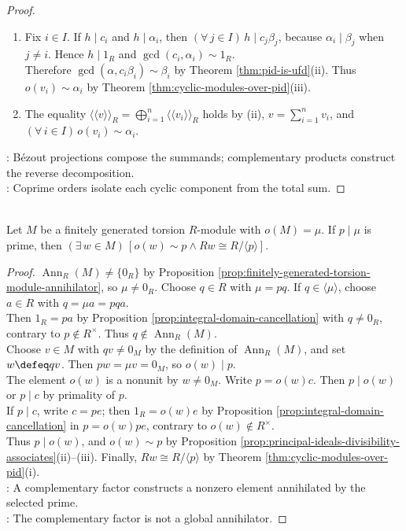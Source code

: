\begin{theorem}
\begin{proof}
\begin{enumerate}[label=(\roman*)]
\begin{enumerate}[label=(\alph*)]
\item Fix $i\in I$. If $h\mid c_i$ and $h\mid\alpha_i$, then $(\forall\,j\in I)\,h\mid c_j\beta_j$, because $\alpha_i\mid\beta_j$ when $j\neq i$. Hence $h\mid1_R$ and $\gcd(c_i,\alpha_i)\sim1_R$.\\
Therefore $\gcd(\alpha,c_i\beta_i)\sim\beta_i$ by Theorem \ref{thm:pid-is-ufd}(ii). Thus $o(v_i)\sim\alpha_i$ by Theorem \ref{thm:cyclic-modules-over-pid}(iii).
\item The equality $\langle\!\langle v\rangle\!\rangle_R=\bigoplus\limits_{i=1}^{n}\langle\!\langle v_i\rangle\!\rangle_R$ holds by (ii), $v=\sum\limits_{i=1}^{n}v_i$, and $(\forall\,i\in I)\,o(v_i)\sim\alpha_i$.
\end{enumerate}
\end{enumerate}
\noindent
{}: Bézout projections compose the summands; complementary products construct the reverse decomposition.\\
: Coprime orders isolate each cyclic component from the total sum.
\end{proof}
\end{theorem}

\begin{proposition} \label{prop:prime-divisor-prime-order-submodule} \\
Let $M$ be a finitely generated torsion $R$-module with $o(M)=\mu$. If $p\mid\mu$ is prime, then $(\exists\,w\in M)\,[o(w)\sim p\land Rw\cong R/\langle p\rangle]$.
\begin{proof}
$\operatorname{Ann}_R(M)\neq\{0_R\}$ by Proposition \ref{prop:finitely-generated-torsion-module-annihilator}, so $\mu\neq0_R$. Choose $q\in R$ with $\mu=pq$. If $q\in\langle\mu\rangle$, choose $a\in R$ with $q=\mu a=pqa$.\\
Then $1_R=pa$ by Proposition \ref{prop:integral-domain-cancellation} with $q\neq0_R$, contrary to $p\notin R^\times$. Thus $q\notin\operatorname{Ann}_R(M)$.\\
Choose $v\in M$ with $qv\neq0_M$ by the definition of $\operatorname{Ann}_R(M)$, and set $w\defeq qv$. Then $pw=\mu v=0_M$, so $o(w)\mid p$.\\
The element $o(w)$ is a nonunit by $w\neq0_M$. Write $p=o(w)c$. Then $p\mid o(w)$ or $p\mid c$ by primality of $p$.\\
If $p\mid c$, write $c=pe$; then $1_R=o(w)e$ by Proposition \ref{prop:integral-domain-cancellation} in $p=o(w)pe$, contrary to $o(w)\notin R^\times$.\\
Thus $p\mid o(w)$, and $o(w)\sim p$ by Proposition \ref{prop:principal-ideals-divisibility-associates}(ii)--(iii). Finally, $Rw\cong R/\langle p\rangle$ by Theorem \ref{thm:cyclic-modules-over-pid}(i).\\
: A complementary factor constructs a nonzero element annihilated by the selected prime.\\
: The complementary factor is not a global annihilator.
\end{proof}
\end{proposition}
